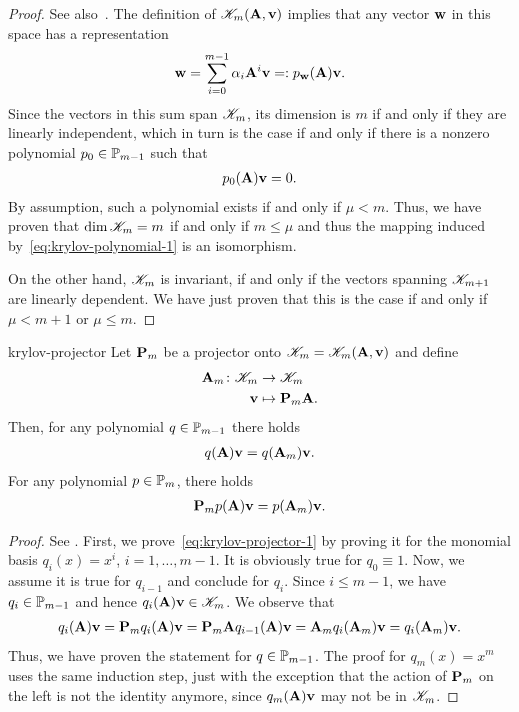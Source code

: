 \begin{proof}
  See also~\cite[Propositions 6.1 \& 6.2]{Saad00}.
  The definition of $\krylov_m(\mata,\vv)$ implies that any vector $\vw$ in this space has a representation
  \begin{gather}
    \vw = \sum_{i=0}^{m-1} \alpha_i \mata^i\vv =: p_{\vw}(\mata) \vv.
  \end{gather}
  Since the vectors in this sum span $\krylov_m$, its dimension is
  $m$ if and only if they are linearly independent, which in turn is
  the case if and only if there is a nonzero polynomial
  $p_0\in\P_{m-1}$ such that
  \begin{gather}
    p_0(\mata)\vv = 0.
  \end{gather}
  By assumption, such a polynomial exists if and only if
  $\mu<m$. Thus, we have proven that $\dim \krylov_m = m$ if and only
  if $m\le \mu$ and thus the mapping induced
  by~\eqref{eq:krylov-polynomial-1} is an isomorphism.

  On the other hand, $\krylov_m$ is invariant, if and only if the
  vectors spanning $\krylov_{m+1}$ are linearly dependent. We have
  just proven that this is the case if and only if $\mu<m+1$ or
  $\mu\le m$.
\end{proof}

\begin{Lemma}{krylov-projector}
  Let $\matp_m$ be a projector onto $\krylov_m=\krylov_m(\mata,\vv)$ and define
  \begin{align}
    \mata_m\colon \krylov_m &\to \krylov_m\\
    \vv&\mapsto \matp_m \mata.
  \end{align}
  Then, for any polynomial $q\in\P_{m-1}$ there holds
  \begin{gather}
    \label{eq:krylov-projector-1}
    q(\mata)\vv = q(\mata_m)\vv.
  \end{gather}
  For any polynomial $p\in\P_m$, there holds
  \begin{gather}
    \label{eq:krylov-projector-2}
    \matp_m p(\mata)\vv = p(\mata_m)\vv.
  \end{gather}
\end{Lemma}

\begin{proof}
  See \cite[Proposition 6.3]{Saad00}.  First, we
  prove~\eqref{eq:krylov-projector-1} by proving it for the monomial
  basis $q_i(x) = x^i$, $i=1,\dots,m-1$. It is obviously true for
  $q_0\equiv 1$. Now, we assume it is true for $q_{i-1}$ and conclude for
  $q_{i}$. Since $i\le m-1$, we have $q_{i}\in\P_{m-1}$ and hence
  $q_{i}(\mata)\vv\in \krylov_m$.  We observe that
  \begin{gather}
    q_{i}(\mata)\vv = \matp_m q_{i}(\mata)\vv = \matp_m \mata q_{i-1}(\mata)\vv
    = \mata_m q_i(\mata_m)\vv
    = q_{i}(\mata_m)\vv.
  \end{gather}
  Thus, we have proven the
  statement for $q\in\P_{m-1}$. The proof for $q_{m}(x) = x^m$ uses
  the same induction step, just with the exception that the action of
  $\matp_m$ on the left is not the identity anymore, since
  $q_m(\mata)\vv$ may not be in $\krylov_m$.
\end{proof}

